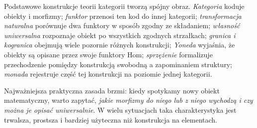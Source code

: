\documentclass[11pt,a4paper]{article}
\numberwithin{equation}{section}
\theoremstyle{plain}
\theoremstyle{definition}
\theoremstyle{remark}
\begin{document}
Podstawowe konstrukcje teorii kategorii tworzą spójny obraz. \emph{Kategoria} koduje obiekty i morfizmy; \emph{funktor} przenosi ten kod do innej kategorii; \emph{transformacja naturalna} porównuje dwa funktory w sposób zgodny ze składaniem; \emph{własność uniwersalna} rozpoznaje obiekt po wszystkich zgodnych strzałkach; \emph{granica i kogranica} obejmują wiele pozornie różnych konstrukcji; \emph{Yoneda} wyjaśnia, że obiekty są opisane przez swoje funktory Hom; \emph{sprzężenie} formalizuje przechodzenie pomiędzy konstrukcją swobodną a zapominaniem struktury; \emph{monada} rejestruje część tej konstrukcji na poziomie jednej kategorii.

Najważniejsza praktyczna zasada brzmi: kiedy spotykamy nowy obiekt matematyczny, warto zapytać, \emph{jakie morfizmy do niego lub z niego wychodzą i czy można je opisać uniwersalnie}. W wielu sytuacjach taka charakterystyka jest trwalsza, prostsza i bardziej użyteczna niż konstrukcja na elementach.
\end{document}
